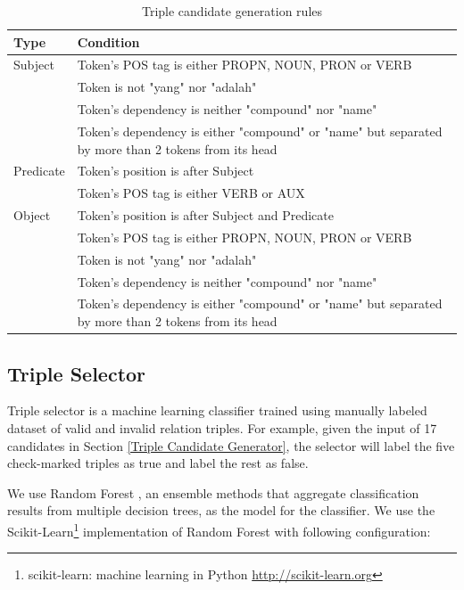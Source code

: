 \begin{table}[!t]
\renewcommand{\arraystretch}{1.5}
\caption{Triple candidate generation rules}
\label{tab:triple_candidate_generation_rules}
\centering
\begin{tabular}{l p{6cm}}
\hline
\textbf{Type} & \textbf{Condition} \\
\hline
Subject & Token's POS tag is either PROPN, NOUN, PRON or VERB \\
\space & Token is not "yang" nor "adalah" \\
\space & Token's dependency is neither "compound" nor "name" \\
\space & Token's dependency is either "compound" or "name" but separated by more than 2 tokens from its head \\
\hline
Predicate & Token's position is after Subject \\
\space & Token's POS tag is either VERB or AUX \\
\hline
Object & Token's position is after Subject and Predicate \\
\space & Token's POS tag is either PROPN, NOUN, PRON or VERB \\
\space & Token is not "yang" nor "adalah" \\
\space & Token's dependency is neither "compound" nor "name" \\
\space & Token's dependency is either "compound" or "name" but separated by more than 2 tokens from its head \\
\end{tabular}
\end{table}


\subsection{Triple Selector}  \label{Triple Selector}

Triple selector is a machine learning classifier trained using manually labeled dataset of valid and invalid relation triples. For example, given the input of 17 candidates in Section \ref{Triple Candidate Generator}, the selector will label the five check-marked triples as true and label the rest as false.

We use Random Forest \citep{breiman2001random}, an ensemble methods that aggregate classification results from multiple decision trees, as the model for the classifier. We use the Scikit-Learn\footnote{scikit-learn: machine learning in Python \url{http://scikit-learn.org}} implementation of Random Forest with following configuration:

